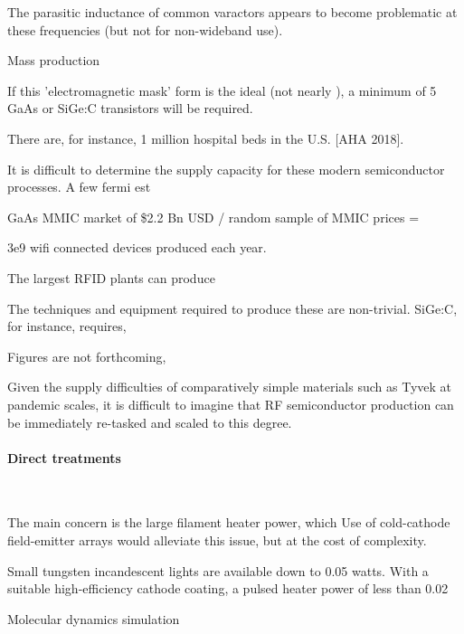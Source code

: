 \documentclass[fleqn,10pt]{article}
\begin{document}
\begin{multicols}{1}
The parasitic inductance of common varactors appears to become problematic at these frequencies (but not for non-wideband use).






\clearpage
{\Large Mass production}


If this 'electromagnetic mask' form is the ideal (not nearly ), a minimum of 5 GaAs or SiGe:C transistors will be required.

There are, for instance, 1 million hospital beds in the U.S. [AHA 2018]. 

It is difficult to determine the supply capacity for these modern semiconductor processes. A few fermi est

GaAs MMIC market of \$2.2 Bn USD / random sample of MMIC prices = 

3e9 wifi connected devices produced each year.

The largest RFID plants can produce


The techniques and equipment required to produce these are non-trivial. SiGe:C, for instance, requires, 


Figures are not forthcoming, 

Given the supply difficulties of comparatively simple materials such as Tyvek at pandemic scales, it is difficult to imagine that RF semiconductor production can be immediately re-tasked and scaled to this degree. 

\paragraph{\textbf{Direct treatments}}\

The main concern is the large filament heater power, which  Use of cold-cathode field-emitter arrays would alleviate this issue, but at the cost of complexity.

Small tungsten incandescent lights are available down to 0.05 watts. With a suitable high-efficiency cathode coating, a pulsed heater power of less than 0.02








\clearpage
{\Large Molecular dynamics simulation}\\
\begin{multicols}{1}



\end{multicols}
\end{multicols}
\end{document}
